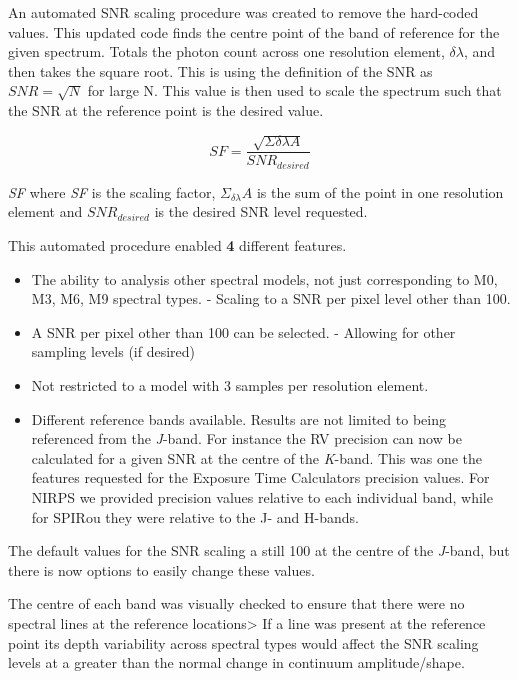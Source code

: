 An automated {SNR} scaling procedure was created to remove the hard-coded values. This updated code finds the centre point of the band of reference for the given spectrum. Totals the photon count across one resolution element, \(\delta\lambda\), and then takes the square root. This is using the definition of the {SNR} as \({SNR} = \sqrt{N}\) for large N. This value is then used to scale the spectrum such that the {SNR} at the reference point is the desired value.

\begin{equation}
    SF =  \frac{\sqrt{\Sigma{\delta\lambda} A}} {SNR_{desired}}
\end{equation}

\textit{SF} where \textit{SF} is the scaling factor, \(\Sigma_{\delta\lambda} A\) is the sum of the point in one resolution element and \({SNR}_{desired}\) is the desired {SNR} level requested.

This automated procedure enabled {\red{}\textbf{4}} different features.
\begin{itemize}
\item The ability to analysis other spectral models, not just corresponding to {M0}, {M3}, {M6}, {M9} spectral types.
    - Scaling to a {SNR} per pixel level other than 100.
\item    A {SNR} per pixel other than 100 can be selected.
    - Allowing for other sampling levels (if desired)
\item      Not restricted to a model with 3 samples per resolution element.
\item Different reference bands available.
    Results are not limited to being referenced from the \textit{J}-band. For instance the {RV} precision can now be calculated for a given {SNR} at the centre of the \textit{K}-band. This was one the features requested for the Exposure Time Calculators precision values. For {NIRPS} we provided precision values relative to each individual band, while for {SPIRou} they were relative to the {J}- and {H}-bands.
\end{itemize}
The default values for the {SNR} scaling a still 100 at the centre of the \textit{J}-band, but there is now options to easily change these values.

The centre of each band was visually checked to ensure that there were no spectral lines at the reference locations> If a line was present at the reference point its depth variability across spectral types would affect the {SNR} scaling levels at a greater than the normal change in continuum amplitude/shape.

